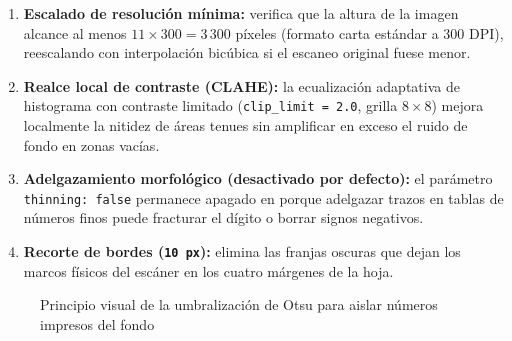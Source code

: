 \documentclass[12pt,letterpaper]{article}
\begin{document}
\begin{enumerate}
  \item \textbf{Escalado de resolución mínima:} verifica que la altura de la imagen alcance al menos \(11 \times 300 = 3\,300\) píxeles (formato carta estándar a \(300\) DPI), reescalando con interpolación bicúbica si el escaneo original fuese menor.
  \item \textbf{Realce local de contraste (CLAHE):} la ecualización adaptativa de histograma con contraste limitado (\texttt{clip\_limit = 2.0}, grilla \(8 \times 8\)) mejora localmente la nitidez de áreas tenues sin amplificar en exceso el ruido de fondo en zonas vacías.
  \item \textbf{Adelgazamiento morfológico (desactivado por defecto):} el parámetro \texttt{thinning: false} permanece apagado en  porque adelgazar trazos en tablas de números finos puede fracturar el dígito  o borrar signos negativos.
  \item \textbf{Recorte de bordes (\texttt{10 px}):} elimina las franjas oscuras que dejan los marcos físicos del escáner en los cuatro márgenes de la hoja.
\end{enumerate}

\begin{figure}[htbp]
  \caption{Principio visual de la umbralización de Otsu para aislar números impresos del fondo}
  \label{fig:otsu_histograma}
  \centering
\end{figure}
\end{document}
